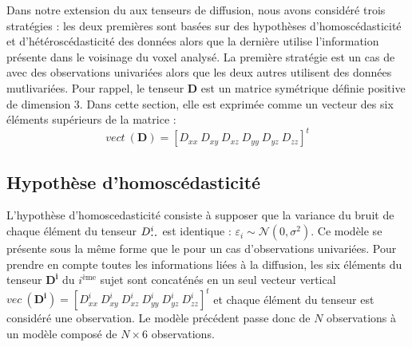 Dans notre extension du \mlg aux tenseurs de diffusion, nous avons considéré trois stratégies : 
les deux premières sont basées sur des hypothèses d'homoscédasticité et d'hétéroscédasticité des données alors que
la dernière utilise l'information présente dans le voisinage du voxel analysé.
La première stratégie est un cas de \mlg avec des observations univariées alors que les deux autres utilisent des données mutlivariées.
Pour rappel, le tenseur $\mathbf{D}$ est un matrice symétrique définie positive de dimension 3.
Dans cette section, elle est exprimée comme un vecteur des six éléments supérieurs de la matrice :
$$vect\ (\mathbf{D})=\left[D_{xx}\ D_{xy}\ D_{xz}\ D_{yy}\ D_{yz}\ D_{zz}\right]^{t}$$

\subsection{Hypothèse d'homoscédasticité}
L'hypothèse d'homoscedasticité consiste à supposer que la variance du bruit de chaque élément du tenseur $D_{\largedot\largedot}^i$ est identique :
$\varepsilon_i \sim \mathcal{N}(0, \sigma^2)$.
Ce modèle se présente sous la même forme que le \mlg pour un cas d'observations univariées.
Pour prendre en compte toutes les informations liées à la diffusion, 
les six éléments du tenseur $\mathbf{D^i}$ du $i^\text{ème}$ sujet sont concaténés en un seul vecteur vertical 
$vec\ (\mathbf{D^i})=\left[D^i_{xx}\ D^i_{xy}\ D^i_{xz}\ D^i_{yy}\ D^i_{yz}\ D^i_{zz}\right]^{t}$  
et chaque élément du tenseur est considéré une observation.
Le modèle précédent passe donc de $N$ observations à un modèle composé de $N\times 6$ observations.

